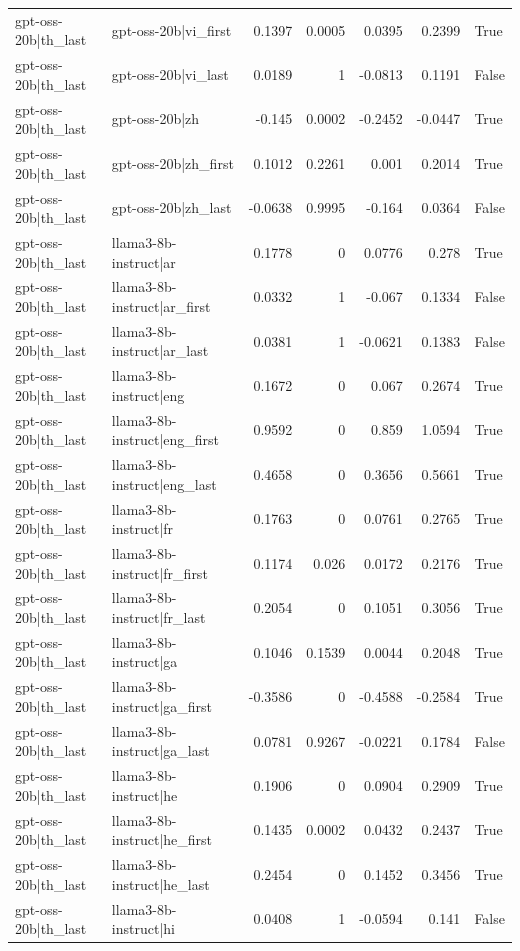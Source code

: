 \begin{table}
\begin{tabular}{l l r r r r l}
gpt-oss-20b|th_last & gpt-oss-20b|vi_first & 0.1397 & 0.0005 & 0.0395 & 0.2399 & True \\
gpt-oss-20b|th_last & gpt-oss-20b|vi_last & 0.0189 & 1 & -0.0813 & 0.1191 & False \\
gpt-oss-20b|th_last & gpt-oss-20b|zh & -0.145 & 0.0002 & -0.2452 & -0.0447 & True \\
gpt-oss-20b|th_last & gpt-oss-20b|zh_first & 0.1012 & 0.2261 & 0.001 & 0.2014 & True \\
gpt-oss-20b|th_last & gpt-oss-20b|zh_last & -0.0638 & 0.9995 & -0.164 & 0.0364 & False \\
gpt-oss-20b|th_last & llama3-8b-instruct|ar & 0.1778 & 0 & 0.0776 & 0.278 & True \\
gpt-oss-20b|th_last & llama3-8b-instruct|ar_first & 0.0332 & 1 & -0.067 & 0.1334 & False \\
gpt-oss-20b|th_last & llama3-8b-instruct|ar_last & 0.0381 & 1 & -0.0621 & 0.1383 & False \\
gpt-oss-20b|th_last & llama3-8b-instruct|eng & 0.1672 & 0 & 0.067 & 0.2674 & True \\
gpt-oss-20b|th_last & llama3-8b-instruct|eng_first & 0.9592 & 0 & 0.859 & 1.0594 & True \\
gpt-oss-20b|th_last & llama3-8b-instruct|eng_last & 0.4658 & 0 & 0.3656 & 0.5661 & True \\
gpt-oss-20b|th_last & llama3-8b-instruct|fr & 0.1763 & 0 & 0.0761 & 0.2765 & True \\
gpt-oss-20b|th_last & llama3-8b-instruct|fr_first & 0.1174 & 0.026 & 0.0172 & 0.2176 & True \\
gpt-oss-20b|th_last & llama3-8b-instruct|fr_last & 0.2054 & 0 & 0.1051 & 0.3056 & True \\
gpt-oss-20b|th_last & llama3-8b-instruct|ga & 0.1046 & 0.1539 & 0.0044 & 0.2048 & True \\
gpt-oss-20b|th_last & llama3-8b-instruct|ga_first & -0.3586 & 0 & -0.4588 & -0.2584 & True \\
gpt-oss-20b|th_last & llama3-8b-instruct|ga_last & 0.0781 & 0.9267 & -0.0221 & 0.1784 & False \\
gpt-oss-20b|th_last & llama3-8b-instruct|he & 0.1906 & 0 & 0.0904 & 0.2909 & True \\
gpt-oss-20b|th_last & llama3-8b-instruct|he_first & 0.1435 & 0.0002 & 0.0432 & 0.2437 & True \\
gpt-oss-20b|th_last & llama3-8b-instruct|he_last & 0.2454 & 0 & 0.1452 & 0.3456 & True \\
gpt-oss-20b|th_last & llama3-8b-instruct|hi & 0.0408 & 1 & -0.0594 & 0.141 & False \\

\end{tabular}
\end{table}
